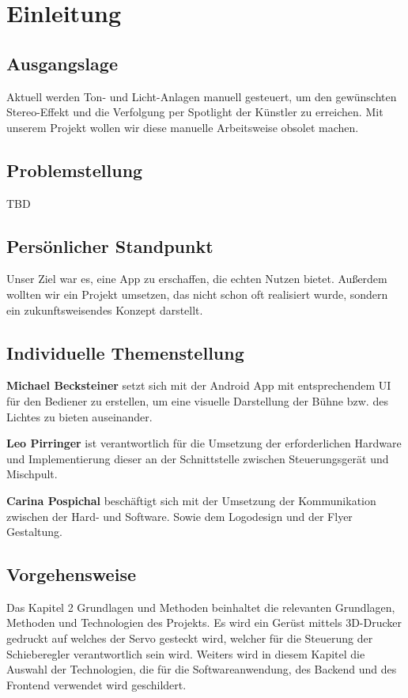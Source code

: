 \chapter{Einleitung}
\section{Ausgangslage}
Aktuell werden Ton- und Licht-Anlagen manuell gesteuert, um den gewünschten Stereo-Effekt und die Verfolgung per Spotlight der Künstler zu erreichen. Mit unserem Projekt wollen wir diese manuelle Arbeitsweise obsolet machen.

\section{Problemstellung}
TBD

\section{Persönlicher Standpunkt}
Unser Ziel war es, eine App zu erschaffen, die echten Nutzen bietet. Außerdem wollten wir ein Projekt umsetzen, das nicht schon oft realisiert wurde, sondern ein zukunftsweisendes Konzept darstellt. 

\section{Individuelle Themenstellung}
\textbf{Michael Becksteiner} setzt sich mit der Android App mit entsprechendem UI für den Bediener zu erstellen, um eine visuelle Darstellung der Bühne bzw. des Lichtes zu bieten auseinander. 

\textbf{Leo Pirringer} ist verantwortlich für die Umsetzung der erforderlichen Hardware und Implementierung dieser an der Schnittstelle zwischen Steuerungsgerät und Mischpult. 

\textbf{Carina Pospichal} beschäftigt sich mit der Umsetzung der Kommunikation zwischen der Hard- und Software. Sowie dem Logodesign und der Flyer Gestaltung. 

\section{Vorgehensweise} 
Das Kapitel 2 Grundlagen und Methoden beinhaltet die relevanten Grundlagen, Methoden und Technologien des Projekts. Es wird ein Gerüst mittels 3D-Drucker gedruckt auf welches der Servo gesteckt wird, welcher für die Steuerung der Schieberegler verantwortlich sein wird. Weiters wird in diesem Kapitel die Auswahl der Technologien, die für die Softwareanwendung, des Backend und des Frontend verwendet wird geschildert.  

